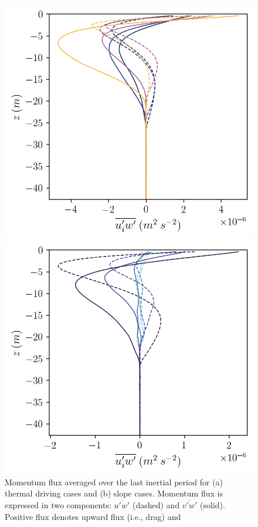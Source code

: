 \documentclass[draft]{agujournal2019}
\begin{document}
\begin{figure}[h!]
    \begin{minipage}{0.5\textwidth}
        \includegraphics[trim={0 0 0 0},clip,width=\textwidth]{Figures/momflux_cmp_dT_43h_tav13h_z_profile.png}
    \end{minipage}%
    \begin{minipage}{0.5\textwidth}
        \includegraphics[trim={0 0 0 0},clip,width=\textwidth]{Figures/momflux_cmp_dslope_43h_tav13h_z_profile.png}
    \end{minipage}
    \caption{Momentum flux averaged over the last inertial period for (a) thermal driving cases and (b) slope cases. Momentum flux is expressed in two components:  $\overline{u'w'}$ (dashed) and $\overline{v'w'}$ (solid). Positive flux denotes upward flux (i.e., drag) and }
    \label{fig:momflux_profiles}
\end{figure}
\end{document}
